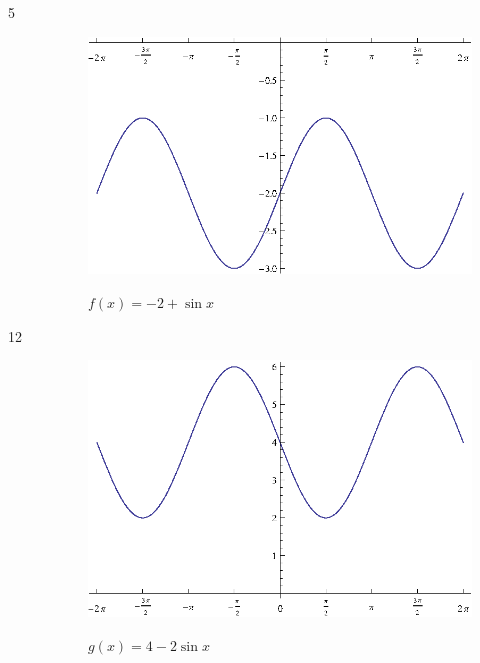 \documentclass{exam}
\begin{document}
\begin{description}
      \item[5]
        \begin{figure}[H]
          \centering
          \includegraphics[scale=0.8]{exercise05.eps}

          $f(x) = -2 + \sin x$
        \end{figure}

      \item[12]
        \begin{figure}[H]
          \centering
          \includegraphics[scale=0.9]{exercise12.eps}

          $g(x) = 4 - 2 \sin x$
        \end{figure}


\end{description}
\end{document}
